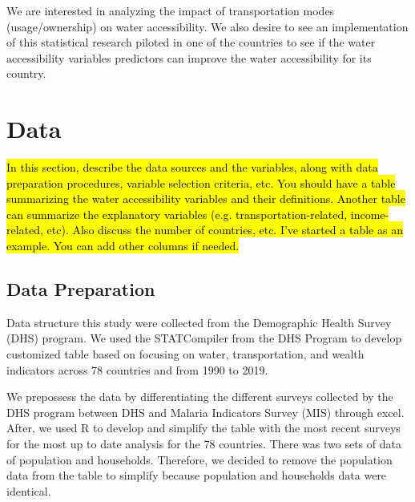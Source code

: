 \documentclass[10pt,twoside]{article}
\numberwithin{equation}{section}
\newcommand{\?}{\stackrel{?}{=}}
\begin{document}
We are interested in analyzing the impact of transportation modes (usage/ownership) on water accessibility. We also desire to see an implementation of this statistical research piloted in one of the countries to see if the water accessibility variables predictors can improve the water accessibility for its country. 

\eject

\section{Data}
\hl{In this section, describe the data sources and the variables, along with data preparation procedures, variable
  selection criteria, etc. You should have a table summarizing the water accessibility variables and their
  definitions. Another table can summarize the explanatory variables (e.g. transportation-related, income-related,
  etc). Also discuss the number of countries, etc. I've started a table as an example. You can add other columns if needed.}
\subsection{Data Preparation}
Data structure this study were collected from the Demographic Health Survey (DHS) program. We used the STATCompiler from the DHS Program to develop customized table based on focusing on water, transportation, and wealth indicators across 78 countries and from 1990 to 2019.

We prepossess the data by differentiating the different surveys collected by the DHS program between DHS and Malaria Indicators Survey (MIS) through excel. After, we used R to develop and simplify the table with the most recent surveys for the most up to date analysis for the 78 countries. There was two sets of data of population and households. Therefore, we decided to remove the population data from the table to simplify because population and households data were identical. 
\end{document}
